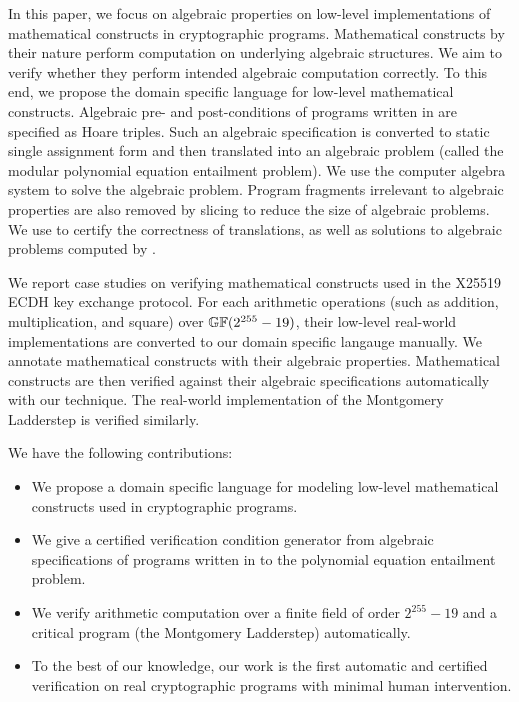 In this paper, we focus on algebraic properties on low-level
implementations of mathematical constructs in cryptographic programs.
Mathematical constructs by their nature perform computation on
underlying algebraic structures. We aim to verify whether they perform
intended algebraic computation correctly. To this end, we propose the
domain specific language \mydsl for low-level 
mathematical constructs. Algebraic pre- and post-conditions of
programs written in \mydsl are specified as Hoare
triples. Such an algebraic specification is converted to static single 
assignment form and then translated into an algebraic problem (called 
the modular polynomial equation entailment problem). We use the computer
algebra system \singular to solve the algebraic problem. 
Program fragments irrelevant to algebraic properties are also
removed by slicing to reduce the size of algebraic problems.
We use \coq to certify the
correctness of translations, as well as solutions to algebraic
problems computed by \singular.

We report case studies on verifying mathematical constructs used in
the X25519 ECDH key exchange protocol. For each arithmetic operations
(such as addition, multiplication, and square) over $\mathbb{GF}(2^{255} - 19)$,
their low-level real-world implementations are converted to our domain
specific langauge \mydsl manually. We annotate mathematical
constructs with their algebraic properties. Mathematical constructs
are then verified against their algebraic
specifications automatically with our technique. 
The real-world implementation of the Montgomery Ladderstep is 
verified similarly.  



We have the following contributions:
\begin{itemize}
\item We propose a domain specific language \mydsl for modeling low-level
  mathematical constructs used in cryptographic programs.
\item We give a certified verification condition generator from
  algebraic specifications of programs written in \mydsl to the polynomial
  equation entailment problem.
\item We verify arithmetic computation over a finite field of order
  $2^{255} - 19$ and a
  critical program (the Montgomery Ladderstep) automatically.
\item To the best of our knowledge, our work is the first automatic
  and certified verification on real cryptographic programs with
  minimal human intervention.
\end{itemize}

